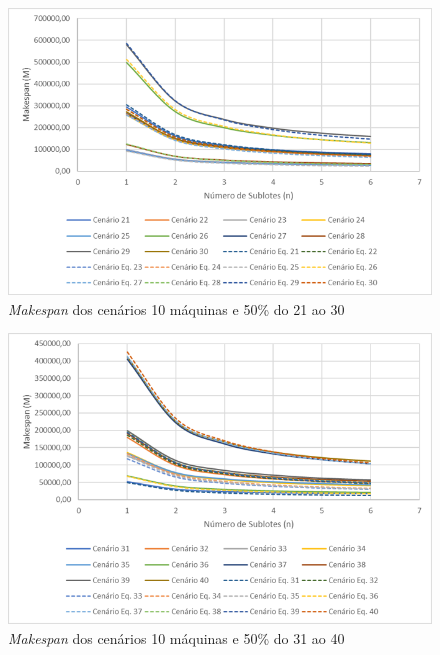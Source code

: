 \begin{figure}[H]
    \centering
     \includegraphics[width=13cm]{Apendices/Figuras/10m50_21-30.png}
     \caption{\textit{Makespan} dos cenários 10 máquinas e 50\% do 21 ao 30}
    \label{fig:10m50_21-30}
\end{figure}

\begin{figure}[H]
    \centering
     \includegraphics[width=13cm]{Apendices/Figuras/10m50_31-40.png}
     \caption{\textit{Makespan} dos cenários 10 máquinas e 50\% do 31 ao 40}
    \label{fig:10m50_31-40}
\end{figure}

